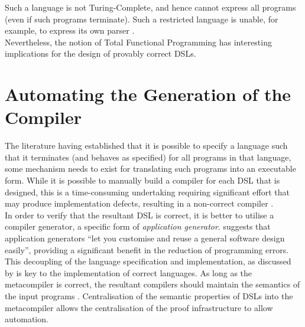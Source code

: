 Such a language is not Turing-Complete, and hence cannot express all programs (even if such programs terminate). 
Such a restricted language is unable, for example, to express its own parser \citep{turner2004total}.\\

Nevertheless, the notion of Total Functional Programming has interesting implications for the design of provably correct DSLs.



\section{Automating the Generation of the Compiler} %
\label{sec:automating_the_generation_of_the_compiler}

The literature having established that it is possible to specify a language such that it terminates (and behaves as specified) for all programs in that language, some mechanism needs to exist for translating such programs into an executable form.
While it is possible to manually build a compiler for each DSL that is designed, this is a time-consuming undertaking requiring significant effort that may produce implementation defects, resulting in a non-correct compiler \citep{Mernik:2005:DDL:1118890.1118892}.\\

In order to verify that the resultant DSL is correct, it is better to utilise a compiler generator, a specific form of \textit{application generator}.
\citet{cleaveland1988building} suggests that application generators ``let you customise and reuse a general software design easily'', providing a significant benefit in the reduction of programming errors.\\

This decoupling of the language specification and implementation, as discussed by \citet{cleaveland1988building} is key to the implementation of correct languages.
As long as the metacompiler is correct, the resultant compilers should maintain the semantics of the input programs \citep{Gray:1992:ECF:129630.129637}.
Centralisation of the semantic properties of DSLs into the metacompiler allows the centralisation of the proof infrastructure to allow automation.\\

